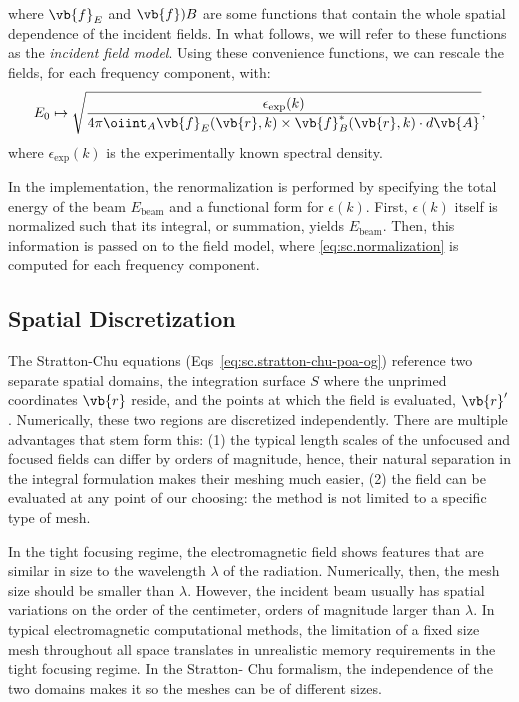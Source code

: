 \documentclass[11pt,SymmetricalJury]{inrsthesis/inrsthesis}
\begin{document}
where $\vb{f}_E$ and $\vb{f})B$ are some functions that contain the whole
spatial dependence of the incident fields. In what follows, we will refer to
these functions as the \textit{incident field model}. Using these convenience
functions, we can rescale the fields, for each frequency component, with:
  \begin{equation}
    E_0 \mapsto \sqrt{%
      \frac{\epsilon_\text{exp}(k)}
           {4\pi\oiint_A\real{\vb{f}_E(\vb{r},k)\times\vb{f}_B^*(\vb{r},k)}\cdot d\vb{A}}
    },
    \label{eq:sc.normalization}
  \end{equation}
where $\epsilon_\text{exp}(k)$ is the experimentally known spectral density.

In the implementation, the renormalization is performed by specifying the total
energy of the beam $E_\text{beam}$ and a functional form for $\epsilon(k)$.
First, $\epsilon(k)$ itself is normalized such that its integral, or summation,
yields $E_\text{beam}$. Then, this information is passed on to the field model,
where
\eqref{eq:sc.normalization} is computed for each frequency
component.

\subsection{Spatial Discretization}

The Stratton-Chu equations (Eqs~\eqref{eq:sc.stratton-chu-poa-og}) reference two
separate spatial domains, the integration surface $S$ where the unprimed
coordinates $\vb{r}$ reside, and the points at which the field is evaluated,
$\vb{r}'$. Numerically, these two regions are discretized independently. There
are multiple advantages that stem form this: (1) the typical length scales of
the unfocused and focused fields can differ by orders of magnitude, hence, their
natural separation in the integral formulation makes their meshing much easier,
(2)  the field can be evaluated at any point of our choosing: the method is not
limited to a specific type of mesh.



In the tight focusing regime, the electromagnetic field shows features that are
similar in size to the wavelength $\lambda$ of the radiation. Numerically, then,
the mesh size should be smaller than $\lambda$. However, the incident beam
usually has spatial variations on the order of the centimeter, orders of
magnitude larger than $\lambda$. In typical electromagnetic computational
methods, the limitation of a fixed size mesh throughout all space translates in
unrealistic memory requirements in the tight focusing regime. In the Stratton-
Chu formalism, the independence of the two domains makes it so the meshes can be
of different sizes.
\end{document}
